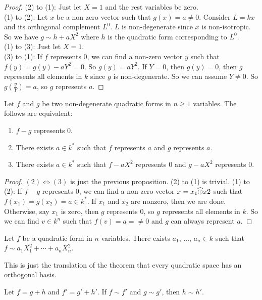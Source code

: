 \documentclass[15pt]{scrartcl}
\newcommand{\po}{\wh{\oplus}}
\begin{document}
\begin{proof}
    (2) to (1): Just let $X=1$ and the rest variables be zero.
    \\

    (1) to (2): Let $x$ be a non-zero vector such that $g(x)=a\neq 0$. Consider $L=kx$ and its orthogonal complement $L^0$. $L$ is non-degenerate since $x$ is non-isotropic. So we have $g\sim h+aX^2$ where $h$ is the quadratic form corresponding to $L^0$.
    \\

    (1) to (3): Just let $X=1$. 
    \\

    (3) to (1): If $f$ represents $0$, we can find a non-zero vector $y$ such that $f(y)=g(y)-aY^2=0$. So $g(y)=aY^2$. If $Y=0$, then $g(y)=0$, then $g$ represents all elements in $k$ since $g$ is non-degenerate. So we can assume $Y\neq 0$. So $g(\frac{y}{Y})=a$, so $g$ represents $a$.
\end{proof}
\begin{proposition}
    Let $f$ and $g$ be two non-degenerate quadratic forms in $n\geq 1$ variables. The follows are equivalent:
    \begin{enumerate}
        \item $f-g$ represents $0$. 
        \item There exists $a\in k^*$ such that $f$ represents $a$ and $g$ represents $a$.
        \item There exists $a\in k^*$ such that $f-aX^2$ represents $0$ and $g-aX^2$ represents $0$.
    \end{enumerate}
\end{proposition}
\begin{proof}
    $(2)\iff (3)$ is just the previous proposition. (2) to (1) is trivial. (1) to (2): If $f-g$ represents $0$, we can find a non-zero vector $x=x_1\po x2$ such that $f(x_1)=g(x_2)=a\in k^*$. If $x_1$ and $x_2$ are nonzero, then we are done. Otherwise, say $x_1$ is zero, then $g$ represents $0$, so $g$ represents all elements in $k$. So we can find $v\in k^n$ such that $f(v)=a=\neq 0$ and $g$ can always represent $a$.
\end{proof}
\begin{theorem}
    Let $f$ be a quadratic form in $n$ variables. There exists $a_1$, $\ldots$, $a_n\in k$ such that $f\sim a_1X_1^2+\cdots +a_nX_n^2$.
\end{theorem}
This is just the translation of the theorem that every quadratic space has an orthogonal basis.
\begin{theorem}
    Let $f=g+h$ and $f'=g'+h'$. If $f\sim f'$ and $g\sim g'$, then $h\sim h'$.
\end{theorem}
\end{document}
